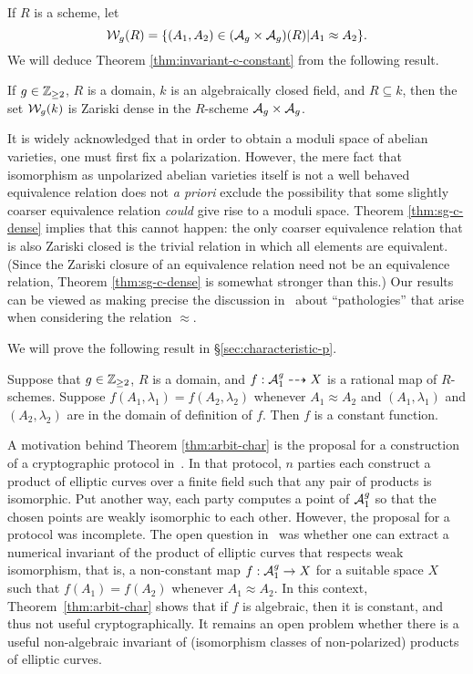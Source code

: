 \documentclass{amsart}
\begin{document}
If $R$ is a scheme, let
$$
\mathcal{W}_g(R) = \{(A_1,A_2) \in (\mathcal{A}_g \times \mathcal{A}_g)(R) | A_1 \approx A_2\}.
$$
We will deduce Theorem \ref{thm:invariant-c-constant} from the following result.

\begin{theorem}\label{thm:sg-c-dense}
  If $g\in\mathbb{Z}_{\ge 2}$, $R$ is a domain, $k$ is an algebraically closed field, and $R \subseteq k$, then the set $\mathcal{W}_g(k)$ is Zariski dense in the $R$-scheme $\mathcal{A}_g \times \mathcal{A}_g$.
\end{theorem}

It is widely acknowledged that in order to obtain a moduli space of abelian varieties, one must first fix a polarization.  However, the mere fact that isomorphism as unpolarized abelian varieties itself is not a well behaved equivalence relation does not {\it a priori} exclude the possibility that some slightly coarser equivalence relation {\em could} give rise to a moduli space. Theorem \ref{thm:sg-c-dense} implies that this cannot happen: the only coarser equivalence relation that is also Zariski closed is the trivial relation in which all elements are equivalent.
(Since the Zariski closure of an equivalence relation need not be an equivalence relation, Theorem \ref{thm:sg-c-dense} is somewhat stronger than this.)
Our results can be viewed as making precise the discussion in~\cite[p. 97]{git} about  ``pathologies'' that arise when considering the relation $\approx$.

We will prove the following result in \S\ref{sec:characteristic-p}.
\begin{theorem}\label{thm:arbit-char}
  Suppose that $g\in\mathbb{Z}_{\ge 2}$, $R$ is a domain, and $f: \mathcal{A}_1^g \dashrightarrow X$ is a rational map of $R$-schemes. Suppose $f(A_1,\lambda_1) = f(A_2,\lambda_2)$ whenever $A_1 \approx A_2$ and $(A_1,\lambda_1)$ and $(A_2,\lambda_2)$ are in the domain of definition of $f$. Then $f$ is a constant function.
\end{theorem}

A motivation behind Theorem \ref{thm:arbit-char} is the proposal for a construction of a cryptographic protocol in~\cite{multiparty}. In that protocol, $n$ parties each construct a product of elliptic curves over a finite field such that any pair of products is isomorphic. Put another way, each party computes a point of $\mathcal{A}_1^g$ so that the chosen points are weakly isomorphic to each other. However, the proposal for a protocol was incomplete. The open question in~\cite{multiparty} was whether one can extract a numerical invariant of the product of elliptic curves that respects weak isomorphism, that is, a non-constant map $f: \mathcal{A}_1^g \to X$ for a suitable space $X$ such that $f(A_1) = f(A_2)$ whenever $A_1 \approx A_2$. In this context, Theorem~\ref{thm:arbit-char} shows that if $f$ is algebraic, then it is constant, and thus not useful cryptographically. It remains an open problem whether there is a useful non-algebraic invariant of (isomorphism classes of non-polarized) products of elliptic curves.
\end{document}
